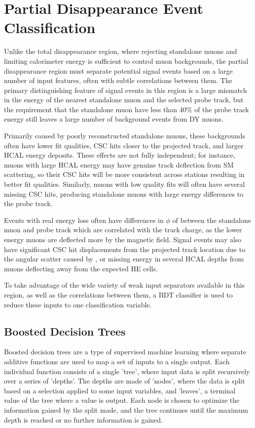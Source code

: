 \chapter{Partial Disappearance Event Classification}
\label{sec:BDT}
Unlike the total disappearance region, where rejecting standalone muons and limiting calorimeter energy is sufficient to control muon backgrounds, the partial disappearance region must separate potential signal events based on a large number of input features, often with subtle correlations between them.
The primary distinguishing feature of signal events in this region is a large mismatch in the energy of the nearest standalone muon and the selected probe track, but the requirement that the standalone muon have less than 40$\%$ of the probe track energy still leaves a large number of background events from DY muons.

Primarily caused by poorly reconstructed standalone muons, these backgrounds often have lower fit qualities, CSC hits closer to the projected track, and larger HCAL energy deposits.
These effects are not fully independent; for instance, muons with large HCAL energy may have genuine track deflection from SM scattering, so their CSC hits will be more consistent across stations resulting in better fit qualities.
Similarly, muons with low quality fits will often have several missing CSC hits, producing standalone muons with large energy differences to the probe track. 

Events with real energy loss often have differences in $\phi$ of between the standalone muon and probe track which are correlated with the track charge, as the lower energy muons are deflected more by the magnetic field.
Signal events may also have significant CSC hit displacements from the projected track location due to the angular scatter caused by \dbrem, or missing energy in several HCAL depths from muons deflecting away from the expected HE cells.

To take advantage of the wide variety of weak input separators available in this region, as well as the correlations between them, a BDT classifier is used to reduce these inputs to one classification variable.

\section{Boosted Decision Trees}
Boosted decision trees are a type of supervised machine learning where separate additive functions are used to map a set of inputs to a single output.
Each individual function consists of a single 'tree', where input data is split recursively over a series of 'depths'. 
The depths are made of 'nodes', where the data is split based on a selection applied to some input variables, and 'leaves', a terminal value of the tree where a value is output.
Each node is chosen to optimize the information gained by the split made, and the tree continues until the maximum depth is reached or no further information is gained.

